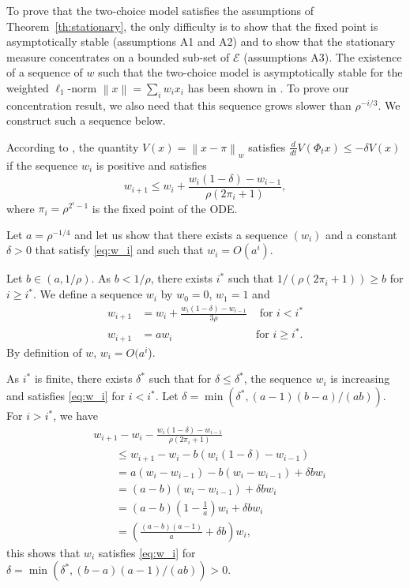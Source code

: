 \documentclass[sigconf]{acmart}
\newcommand\E{\mathcal{E}}
\newcommand\norm[1]{\left\|#1\right\|}
\newcommand\dt{\frac{d}{dt}}
\newcommand\p[1]{\left(#1\right)}
\begin{document}
To prove that the two-choice model satisfies the assumptions of
Theorem~\ref{th:stationary}, the only difficulty is to show that the
fixed point is asymptotically stable (assumptions A1 and A2) and to
show that the stationary measure concentrates on a bounded sub-set of
$\E$ (assumptions A3).  The existence of a sequence of $w$ such that
the two-choice model is asymptotically stable for the weighted
$\ell_1$-norm $\norm{x}=\sum_i w_i x_i$ has been shown in
\cite[Theorem~3.6]{mitzenmacher1996power}. To prove our concentration
result, we also need that this sequence grows slower than
$\rho^{-i/3}$. We construct such a sequence below.

According to \cite[Proof of Theorem~3.6]{mitzenmacher1996power}, the
quantity $V(x)=\norm{x-\pi}_w$ satisfies
$\dt V(\Phi_tx)\le -\delta V(x)$ if the sequence $w_i$ is positive and
satisfies
\begin{equation}
  \label{eq:w_i}
  w_{i+1} \le w_i + \frac{w_i(1-\delta) - w_{i-1}}{\rho
    (2\pi_i+1)},
\end{equation}
where $\pi_i=\rho^{2^i-1}$ is the fixed point of the ODE. 

Let $a=\rho^{-1/4}$ 
and let us show that there exists a sequence
$(w_i)$ and a constant $\delta>0$ that satisfy \eqref{eq:w_i} and such
that $w_i=O(a^i)$.

Let $b\in(a,1/\rho)$. As $b<1/\rho$, there exists $i^*$ such
that $1/(\rho (2\pi_i+1))\ge b$ for $i\ge i^*$. We define a
sequence $w_i$ by $w_0=0$, $w_1=1$ and
\begin{align*}
  w_{i+1} &= w_i+\frac{w_i(1-\delta) - w_{i-1}}{3\rho} 
  &\text{ for $i<i^*$}\\
  w_{i+1} &= aw_i  &\text{for $i\ge i^*$}. 
\end{align*}
By definition of $w$, $w_i=O(a^i$).

As $i^*$ is finite, there exists $\delta^*$ such that for
$\delta\le\delta^*$, the sequence $w_i$ is increasing and satisfies
\eqref{eq:w_i} for $i<i^*$. Let
$\delta=\min(\delta^*,(a-1)(b-a)/(ab))$.  For $i>i^*$, we have
\begin{align*}
  &w_{i+1} - w_i - \frac{w_i(1-\delta)-w_{i-1}}{\rho(2\pi_i+1)} \\
  &\qquad\le w_{i+1}-w_i - b (w_i(1-\delta)-w_{i-1})\\
  &\qquad= a(w_i-w_{i-1}) - b (w_i-w_{i-1}) + \delta b w_{i}\\
  &\qquad= (a-b)(w_i-w_{i-1}) + \delta b w_i \\
  &\qquad= (a-b)\p{1-\frac1a} w_i + \delta b w_i \\
  &\qquad= \p{\frac{(a-b)(a-1)}{a} + \delta b} w_i,
\end{align*}
this shows that $w_i$ satisfies \eqref{eq:w_i} for
$\delta=\min(\delta^*,(b-a)(a-1)/(ab))>0$. 
\end{document}
